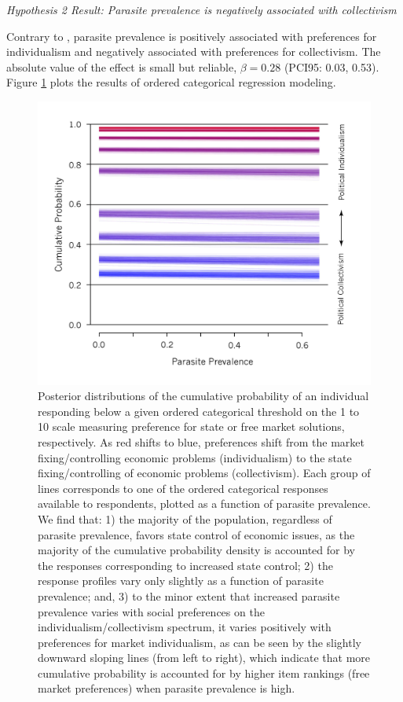 \documentclass[12pt]{article}
\begin{document}
\noindent\textit{Hypothesis 2 Result: Parasite prevalence is negatively associated with collectivism}

	Contrary to \citet{Thornhill2009}, parasite prevalence is positively associated with preferences for individualism and negatively associated with preferences for collectivism.  The absolute value of the effect is small but reliable, $\beta=0.28$ (PCI95: 0.03, 0.53). Figure \ref{resCol} plots the results of ordered categorical regression modeling.\\
 \begin{figure}
\caption{\label{resCol}  Posterior distributions of the cumulative probability of an individual responding below a given ordered categorical threshold on the 1 to 10 scale measuring preference for state or free market solutions, respectively.  As red shifts to blue, preferences shift from the market fixing/controlling economic problems (individualism) to the state fixing/controlling of economic problems (collectivism). Each group of lines corresponds to one of the ordered categorical responses available to respondents, plotted as a function of parasite prevalence.  We find that: 1) the majority of the population, regardless of parasite prevalence, favors state control of economic issues, as the majority of the cumulative probability density is accounted for by the responses corresponding to increased state control; 2) the response profiles vary only slightly as a function of parasite prevalence; and, 3) to the minor extent that increased parasite prevalence varies with social preferences on the individualism/collectivism spectrum, it varies positively with preferences for market individualism, as can be seen by the slightly downward sloping lines (from left to right), which indicate that more cumulative probability is accounted for by higher item rankings (free market preferences) when parasite prevalence is high. }
\includegraphics[width=5in]{Figures/CollectivismModel} 
\end{figure}
\end{document}
